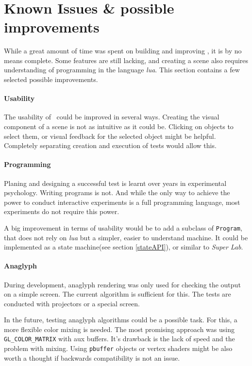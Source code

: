 \section{Known Issues \& possible improvements\label{Issues}}
\paragraph{}
While a great amount of time was spent on building and improving \ER, it is by no means complete.
Some features are still lacking, and creating a scene also requires understanding of programming in the language \textit{lua}.
This section contains a few selected possible improvements.

\paragraph{Usability}
The usability of \ER\ could be improved in several ways.
Creating the visual component of a scene is not as intuitive as it could be.
Clicking on objects to select them, or visual feedback for the selected object might be helpful.
Completely separating creation and execution of tests would allow this.

\paragraph{Programming}
Planing and designing a successful test is learnt over years in experimental psychology.
Writing programs is not.
And while the only way to achieve the power to conduct interactive experiments is a full programming language, most experiments do not require this power.

A big improvement in terms of usability would be to add a subclass of \lstinline{Program}, that does not rely on \textit{lua} but a simpler, easier to understand machine.
It could be implemented as a state machine(see section \ref{stateAPI}), or similar to \textit{Super Lab}\cite{superlab}.

\paragraph{Anaglyph}
During development, anaglyph rendering was only used for checking the output on a simple screen.
The current algorithm is sufficient for this.
The tests are conducted with projectors or a special screen.

In the future, testing anaglyph algorithms could be a possible task.
For this, a more flexible color mixing is needed.
The most promising approach was using \lstinline{GL_COLOR_MATRIX} with aux buffers.
It's drawback is the lack of speed and the problem with mixing.
Using \lstinline{pbuffer} objects or vertex shaders might be also worth a thought if backwards compatibility is not an issue.

